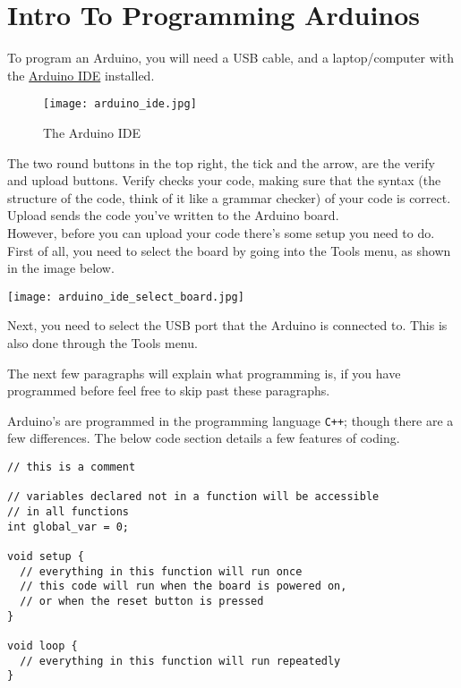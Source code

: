 \documentclass[../TinyBot.tex]{subfiles}
\begin{document}
\section{Intro To Programming Arduinos}

To program an Arduino, you will need a USB cable, and a laptop/computer with the \href{https://www.arduino.cc/en/software}{Arduino IDE} installed. 



\begin{figure}[h]
    \centering
    \texttt{[image: arduino\_ide.jpg]}
    \caption{The Arduino IDE}
\end{figure}

The two round buttons in the top right, the tick and the arrow, are the verify and upload buttons. Verify checks your code, making sure that the syntax (the structure of the code, think of it like a grammar checker) of your code is correct. Upload sends the code you've written to the Arduino board.  \\

However, before you can upload your code there's some setup you need to do. First of all, you need to select the board by going into the Tools menu, as shown in the image below. 

\begin{center}
  \texttt{[image: arduino\_ide\_select\_board.jpg]}
\end{center}

Next, you need to select the USB port that the Arduino is connected to. This is also done through the Tools menu. 
\begin{center}
  
\end{center}

The next few paragraphs will explain what programming is, if you have programmed before feel free to skip past these paragraphs. 

Arduino's are programmed in the programming language \lstinline[]!C++!; though there are a few differences. The below code section details a few features of coding.


\begin{lstlisting}
// this is a comment

// variables declared not in a function will be accessible
// in all functions
int global_var = 0;

void setup {
  // everything in this function will run once
  // this code will run when the board is powered on, 
  // or when the reset button is pressed
}

void loop {
  // everything in this function will run repeatedly
}

\end{lstlisting}
\bigskip
\end{document}
